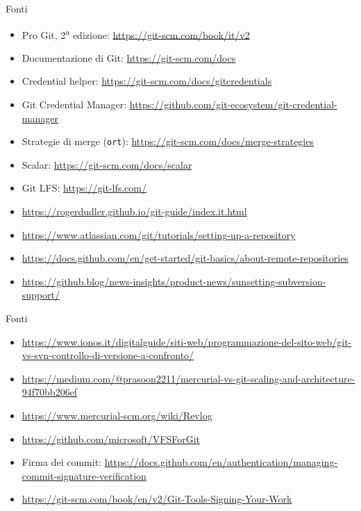 \documentclass[aspectratio=169,handout,10pt]{beamer}
\begin{document}
\begin{frame}{Fonti}
    \begin{itemize}
        \item Pro Git, 2\textsuperscript{a} edizione: \url{https://git-scm.com/book/it/v2}
        \item Documentazione di Git: \url{https://git-scm.com/docs}
        \item Credential helper: \url{https://git-scm.com/docs/gitcredentials}
        \item Git Credential Manager: \url{https://github.com/git-ecosystem/git-credential-manager}
        \item Strategie di merge (\texttt{ort}): \url{https://git-scm.com/docs/merge-strategies}
        \item Scalar: \url{https://git-scm.com/docs/scalar}
        \item Git LFS: \url{https://git-lfs.com/}
        \item \url{https://rogerdudler.github.io/git-guide/index.it.html}
        \item \url{https://www.atlassian.com/git/tutorials/setting-up-a-repository}
        \item \url{https://docs.github.com/en/get-started/git-basics/about-remote-repositories}
        \item \url{https://github.blog/news-insights/product-news/sunsetting-subversion-support/}
    \end{itemize}
\end{frame}
\begin{frame}{Fonti}
    \begin{itemize}
        \item \url{https://www.ionos.it/digitalguide/siti-web/programmazione-del-sito-web/git-vs-svn-controllo-di-versione-a-confronto/}
        \item \url{https://medium.com/@prasoon2211/mercurial-vs-git-scaling-and-architecture-94f70bb206ef}
        \item \url{https://www.mercurial-scm.org/wiki/Revlog}
        \item \url{https://github.com/microsoft/VFSForGit}
        \item Firma dei commit: \url{https://docs.github.com/en/authentication/managing-commit-signature-verification}
        \item \url{https://git-scm.com/book/en/v2/Git-Tools-Signing-Your-Work}
    \end{itemize}
\end{frame}
\end{document}

